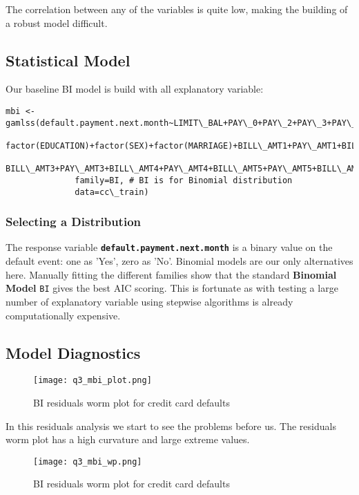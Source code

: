 The correlation between any of the variables is quite low, making the building of a robust model difficult.

\subsection{Statistical Model}

Our baseline BI model is build with all explanatory variable:
\begin{verbatim}
mbi <- gamlss(default.payment.next.month~LIMIT\_BAL+PAY\_0+PAY\_2+PAY\_3+PAY\_4+PAY\_5+PAY\_6+AGE+
                factor(EDUCATION)+factor(SEX)+factor(MARRIAGE)+BILL\_AMT1+PAY\_AMT1+BILL\_AMT2+PAY\_AMT2+
                BILL\_AMT3+PAY\_AMT3+BILL\_AMT4+PAY\_AMT4+BILL\_AMT5+PAY\_AMT5+BILL\_AMT6+PAY\_AMT6, 
              family=BI, # BI is for Binomial distribution
              data=cc\_train)
\end{verbatim}


\subsubsection{Selecting a Distribution}

The response variable \textbf{\verb|default.payment.next.month|} is a binary value on the default event: one as 'Yes', zero as 'No'.
Binomial models are our only alternatives here. Manually fitting the different families show that the standard \textbf{Binomial Model}
\verb|BI| gives the best AIC scoring.  This is fortunate as with testing a large number of explanatory variable using stepwise
algorithms is already computationally expensive.


\subsection{Model Diagnostics}

\begin{figure}[H]
  \texttt{[image: q3\_mbi\_plot.png]}
  \caption{BI residuals worm plot for credit card defaults}
\end{figure}

In this residuals analysis we start to see the problems before us.  The residuals worm plot has a high curvature and large extreme
values.

\begin{figure}[H]
  \texttt{[image: q3\_mbi\_wp.png]}
  \caption{BI residuals worm plot for credit card defaults}
\end{figure}

